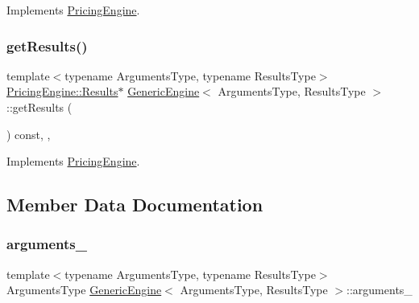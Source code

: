 Implements \hyperlink{class_pricing_engine_a399f4519f58b2ac1d108ce14d0058c97}{Pricing\+Engine}.

\hypertarget{class_generic_engine_a2b8d7fba7e51c0795ea9f1e9c2f54afd}{}\label{class_generic_engine_a2b8d7fba7e51c0795ea9f1e9c2f54afd} 
\subsubsection{\texorpdfstring{get\+Results()}{getResults()}}
{\footnotesize\ttfamily template$<$typename Arguments\+Type, typename Results\+Type$>$ \\
\hyperlink{class_pricing_engine_1_1_results}{Pricing\+Engine\+::\+Results}$\ast$ \hyperlink{class_generic_engine}{Generic\+Engine}$<$ Arguments\+Type, Results\+Type $>$\+::get\+Results (\begin{DoxyParamCaption}{ }\end{DoxyParamCaption}) const\hspace{0.3cm}{\ttfamily [inline]}, {\ttfamily [override]}, {\ttfamily [virtual]}}



Implements \hyperlink{class_pricing_engine_a73e2852ef4c28e92a402492e86717d0b}{Pricing\+Engine}.



\subsection{Member Data Documentation}
\hypertarget{class_generic_engine_a9ac595191e5d6976c65659d26063bfc8}{}\label{class_generic_engine_a9ac595191e5d6976c65659d26063bfc8} 
\subsubsection{\texorpdfstring{arguments\+\_\+}{arguments\_}}
{\footnotesize\ttfamily template$<$typename Arguments\+Type, typename Results\+Type$>$ \\
Arguments\+Type \hyperlink{class_generic_engine}{Generic\+Engine}$<$ Arguments\+Type, Results\+Type $>$\+::arguments\+\_\+\hspace{0.3cm}{\ttfamily [mutable]}}

\hypertarget{class_generic_engine_acd6af7c4b3fd0e43826755ba7d347dd5}{}\label{class_generic_engine_acd6af7c4b3fd0e43826755ba7d347dd5} 

